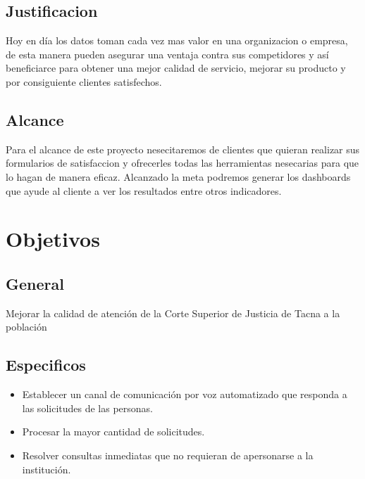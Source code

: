 \documentclass[twoside,twocolumn]{article}
\begin{document}
\subsection{Justificacion}
Hoy en día los datos toman cada vez mas valor en una organizacion o empresa, de esta manera pueden asegurar una ventaja contra sus competidores y así beneficiarce para obtener una mejor calidad de servicio, mejorar su producto y por consiguiente clientes satisfechos.

\subsection{Alcance}
Para el alcance de este proyecto nesecitaremos de clientes que quieran realizar sus formularios de satisfaccion y ofrecerles todas las herramientas nesecarias para que lo hagan de manera eficaz. Alcanzado la meta podremos generar los dashboards que ayude al cliente a ver los resultados entre otros indicadores.


\section{Objetivos}
\subsection{General}
Mejorar la calidad de atención de la Corte Superior de Justicia de Tacna a la población

\subsection{Especificos}
\begin{itemize}
\item Establecer un canal de comunicación por voz automatizado que responda a las solicitudes de las personas.
\item Procesar la mayor cantidad de solicitudes.
\item Resolver consultas inmediatas que no requieran de apersonarse a la institución.
\end{itemize}
\end{document}
